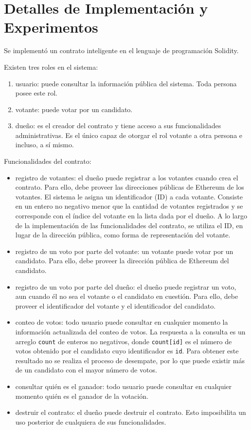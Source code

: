 \chapter{Detalles de Implementación y Experimentos}\label{chapter:implementation}

Se implement\'o un contrato inteligente en el lenguaje de programaci\'on Solidity. 

Existen tres roles en el sistema: 
\begin{enumerate}
    \item usuario: puede consultar la informaci\'on p\'ublica del sistema. Toda persona posee este rol.
    \item votante: puede votar por un candidato. 
    \item due\~no: es el creador del contrato y tiene acceso a sus funcionalidades administrativas. Es el \'unico capaz de otorgar el rol votante a otra persona e incluso, a s\'i mismo. 
\end{enumerate}

Funcionalidades del contrato:
\begin{itemize}
    \item registro de votantes: el due\~no puede registrar a los votantes cuando crea el contrato. Para ello, debe proveer las direcciones p\'ublicas de Ethereum de los votantes. El sistema le asigna un identificador (ID) a cada votante. Consiste en un entero no negativo menor que la cantidad de votantes registrados y se corresponde con el \'indice del votante en la lista dada por el due\~no. A lo largo de la implementaci\'on de las funcionalidades del contrato, se utiliza el ID, en lugar de la direcci\'on p\'ublica, como forma  de representaci\'on del votante. 
    \item registro de un voto por parte del votante: un votante puede votar por un candidato. Para ello, debe proveer la direcci\'on p\'ublica de Ethereum del candidato.
    \item registro de un voto por parte del due\~no: el due\~no puede registrar un voto, aun cuando \'el no sea el votante o el candidato en cuesti\'on. Para ello, debe proveer el identificador del votante y el identificador del candidato.
    \item conteo de votos: todo usuario puede consultar en cualquier momento la informaci\'on actualizada del conteo de votos.  La respuesta a la consulta es un arreglo \lstinline{count} de enteros no negativos, donde \lstinline{count[id]} es el n\'umero de votos obtenido por el candidato cuyo identificador es \lstinline{id}. Para obtener este resultado no se realiza el proceso de desempate, por lo que puede existir m\'as de un candidato con el mayor n\'umero de votos.  
    \item consultar qui\'en es el ganador:  todo usuario puede consultar en cualquier momento qui\'en es el ganador de la votaci\'on. 
    \item destruir el contrato: el due\~no puede destruir el contrato. Esto imposibilita un uso posterior de cualquiera de sus funcionalidades. 
\end{itemize}

